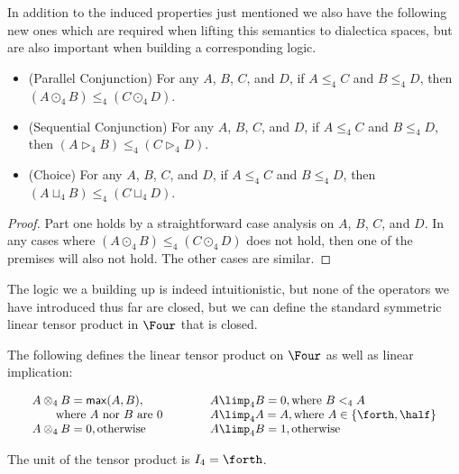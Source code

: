 In addition to the induced properties just mentioned we also have the
following new ones which are required when lifting this semantics to
dialectica spaces, but are also important when building a
corresponding logic.
\begin{lemma}[Functorality]
  \label{lemma:functorality}
  \begin{itemize}
  \item[] (Parallel Conjunction) For any $A$, $B$, $C$, and $D$, if $A \leq_4 C$ and $B \le_4 D$, then
    $(A \odot_4 B) \leq_4 (C \odot_4 D)$.\\
  \item[] (Sequential Conjunction) For any $A$, $B$, $C$, and $D$, if $A \leq_4 C$ and $B \le_4 D$, then
  $(A \rhd_4 B) \leq_4 (C \rhd_4 D)$.\\
  \item[] (Choice) For any $A$, $B$, $C$, and $D$, if $A \leq_4 C$ and $B \le_4 D$, then
  $(A \sqcup_4 B) \leq_4 (C \sqcup_4 D)$.
  \end{itemize}
\end{lemma}
\begin{proof}
  Part one holds by a straightforward case analysis on $A$, $B$, $C$,
  and $D$.  In any cases where $(A \odot_4 B) \leq_4 (C \odot_4 D)$
  does not hold, then one of the premises will also not hold.  The
  other cases are similar.
\end{proof}
The logic we a building up is indeed intuitionistic, but none of the
operators we have introduced thus far are closed, but we can define
the standard symmetric linear tensor product in $\Four$ that is
closed.
\begin{definition}
  \label{def:tensor-and-implication}
  The following defines the linear tensor product on $\Four$ as well
  as linear implication:  
    \begin{center}
      \begin{math}
        \setlength{\arraycolsep}{10px}
        \begin{array}{lll}
          \begin{array}{lll}
            A \otimes_4 B = \mathsf{max}(A,B), \\
          \,\,\,\,\,\,\,\,\,\,\,\,\text{where $A$ nor $B$ are $0$}\\
          A \otimes_4 B = 0, \text{otherwise}
          \end{array}
          &
          \begin{array}{lll}
          A \limp_4 B = 0, \text{where $B <_4 A$}\\
          A \limp_4 A = A, \text{where $A \in \{\forth,\half\}$}\\
          A \limp_4 B = 1, \text{otherwise}
        \end{array}
        \end{array}
      \end{math}
    \end{center}
    The unit of the tensor product is $I_4 = \forth$.\\   
\end{definition}
